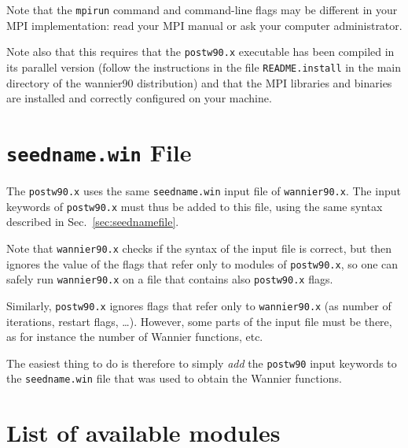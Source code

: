 Note that the {\tt mpirun} command and command-line flags may be
different in your MPI implementation: read your MPI manual or ask your
computer administrator.

Note also that this requires that the {\tt postw90.x} executable has been
compiled in its parallel version (follow the instructions in the file
{\tt README.install} in the main directory of the wannier90
distribution) and
that the MPI libraries and binaries are installed and correctly
configured on your machine.

\section[seedname.win File]{{\tt seedname.win} File}
The \texttt{postw90.x} uses the same \texttt{seedname.win} input file
of \texttt{wannier90.x}. The input keywords of \texttt{postw90.x} must
thus be added to this file, using the same syntax described in
Sec.~\ref{sec:seednamefile}. 

Note that \texttt{wannier90.x} checks if the syntax of the input file
is correct, but then ignores the value of the flags that refer only to
modules of \texttt{postw90.x}, so one can safely run
\texttt{wannier90.x} on a file that contains also \texttt{postw90.x}
flags.

Similarly, \texttt{postw90.x} ignores flags that refer only to
\texttt{wannier90.x} (as number of iterations, restart flags,
\ldots). However, some parts of the input file must be there, as for
instance the number of Wannier functions, etc.

The easiest thing to do
is therefore to simply \emph{add} the \texttt{postw90} input keywords to
the \texttt{seedname.win} file that was used
to obtain the Wannier functions.

\section{List of available modules}

